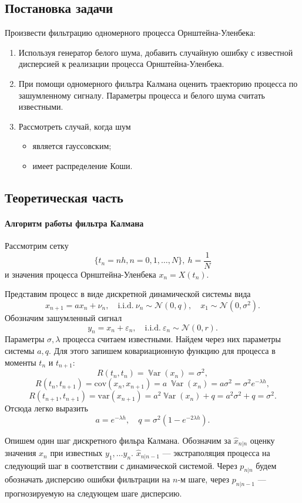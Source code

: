 \documentclass[16pt]{article}
\DeclareMathOperator*{\Var}{\mathbb{V}ar}
\begin{document}
\subsection{Постановка задачи}
Произвести фильтрацию одномерного процесса Орнштейна-Уленбека:
\begin{enumerate}
	\item Используя генератор белого шума, добавить случайную ошибку с известной дисперсией к реализации процесса Орнштейна-Уленбека.
	\item При помощи одномерного фильтра Калмана оценить траекторию процесса по зашумленному сигналу. Параметры процесса и белого шума считать известными.
	\item Рассмотреть случай, когда шум
	\begin{itemize}
		\item является гауссовским;
		\item имеет распределение Коши.
	\end{itemize}
\end{enumerate}

\subsection{Теоретическая часть}
\paragraph{Алгоритм работы фильтра Калмана}
Рассмотрим сетку $$\{t_n = nh, n = 0, 1, \ldots, N\},\ h = \dfrac1N$$ и значения процесса Орнштейна-Уленбека
$x_n = X(t_n).$

Представим процесс в виде дискретной динамической системы вида
$$x_{n+1} = ax_n + \nu_n, \quad \mathrm{i.i.d.}\ \nu_n \sim \mathcal{N}(0, q), \quad x_1 \sim \mathcal{N}(0, \sigma^2).$$
Обозначим зашумленный сигнал
$$y_n = x_n + \varepsilon_n, \quad \mathrm{i.i.d.}\ \varepsilon_n \sim \mathcal{N}(0, r).$$
Параметры $\sigma, \lambda$ процесса считаем известными. Найдем через них параметры системы $a, q$. Для этого запишем ковариационную функцию для процесса в моменты $t_n$ и $t_{n+1}$:
$$R(t_n, t_n) = \Var(x_n) = \sigma^2,$$
$$R(t_n, t_{n+1}) = \mathrm{cov}(x_n, x_{n+1}) = a\ \Var(x_n) = a\sigma^2 = \sigma^2 e^{-\lambda h},$$
$$R(t_{n+1}, t_{n+1}) = \mathrm{var}(x_{n+1}) = a^2\Var(x_n) + q = a^2\sigma^2 + q = \sigma^2.$$
Отсюда легко выразить
$$a = e^{-\lambda h}, \quad q = \sigma^2(1 - e^{-2\lambda h}).$$

Опишем один шаг дискретного фильра Калмана. Обозначим за $\hat x_{n|n}$ оценку значения $x_n$ при известных $y_1, \ldots y_n$. $\hat x_{n|n-1}$ --- экстраполяция процесса на следующий шаг в соответствии с динамической системой. Через $p_{n|n}$ будем обозначать дисперсию ошибки фильтрации на $n$-м шаге, через $p_{n|n-1}$ --- прогнозируемую на следующем шаге дисперсию.
\end{document}
